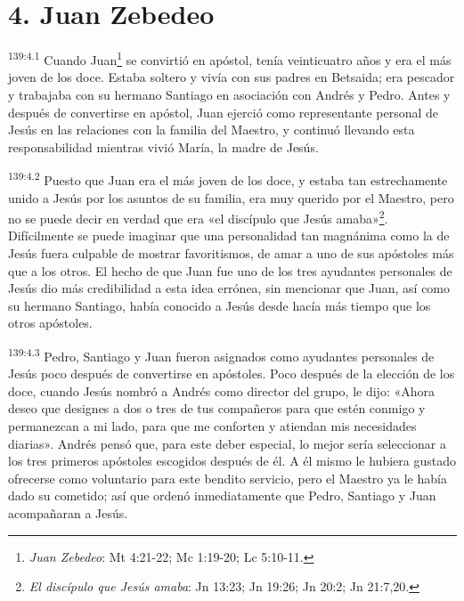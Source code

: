 \section*{4. Juan Zebedeo}
\par 
\textsuperscript{139:4.1} Cuando Juan\footnote{\textit{Juan Zebedeo}: Mt 4:21-22; Mc 1:19-20; Lc 5:10-11.} se convirtió en apóstol, tenía veinticuatro años y era el más joven de los doce. Estaba soltero y vivía con sus padres en Betsaida; era pescador y trabajaba con su hermano Santiago en asociación con Andrés y Pedro. Antes y después de convertirse en apóstol, Juan ejerció como representante personal de Jesús en las relaciones con la familia del Maestro, y continuó llevando esta responsabilidad mientras vivió María, la madre de Jesús.

\par 
\textsuperscript{139:4.2} Puesto que Juan era el más joven de los doce, y estaba tan estrechamente unido a Jesús por los asuntos de su familia, era muy querido por el Maestro, pero no se puede decir en verdad que era «el discípulo que Jesús amaba»\footnote{\textit{El discípulo que Jesús amaba}: Jn 13:23; Jn 19:26; Jn 20:2; Jn 21:7,20.}. Difícilmente se puede imaginar que una personalidad tan magnánima como la de Jesús fuera culpable de mostrar favoritismos, de amar a uno de sus apóstoles más que a los otros. El hecho de que Juan fue uno de los tres ayudantes personales de Jesús dio más credibilidad a esta idea errónea, sin mencionar que Juan, así como su hermano Santiago, había conocido a Jesús desde hacía más tiempo que los otros apóstoles.

\par 
\textsuperscript{139:4.3} Pedro, Santiago y Juan fueron asignados como ayudantes personales de Jesús poco después de convertirse en apóstoles. Poco después de la elección de los doce, cuando Jesús nombró a Andrés como director del grupo, le dijo: «Ahora deseo que designes a dos o tres de tus compañeros para que estén conmigo y permanezcan a mi lado, para que me conforten y atiendan mis necesidades diarias». Andrés pensó que, para este deber especial, lo mejor sería seleccionar a los tres primeros apóstoles escogidos después de él. A él mismo le hubiera gustado ofrecerse como voluntario para este bendito servicio, pero el Maestro ya le había dado su cometido; así que ordenó inmediatamente que Pedro, Santiago y Juan acompañaran a Jesús.

